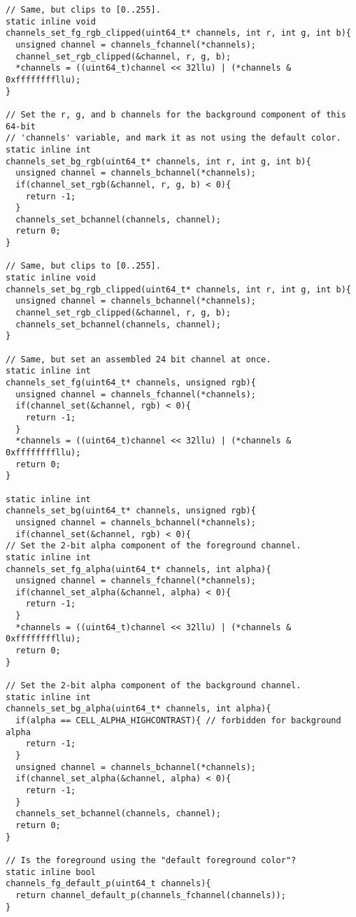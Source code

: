 \begin{verbatim}
// Same, but clips to [0..255].
static inline void
channels_set_fg_rgb_clipped(uint64_t* channels, int r, int g, int b){
  unsigned channel = channels_fchannel(*channels);
  channel_set_rgb_clipped(&channel, r, g, b);
  *channels = ((uint64_t)channel << 32llu) | (*channels & 0xffffffffllu);
}

// Set the r, g, and b channels for the background component of this 64-bit
// 'channels' variable, and mark it as not using the default color.
static inline int
channels_set_bg_rgb(uint64_t* channels, int r, int g, int b){
  unsigned channel = channels_bchannel(*channels);
  if(channel_set_rgb(&channel, r, g, b) < 0){
    return -1;
  }
  channels_set_bchannel(channels, channel);
  return 0;
}

// Same, but clips to [0..255].
static inline void
channels_set_bg_rgb_clipped(uint64_t* channels, int r, int g, int b){
  unsigned channel = channels_bchannel(*channels);
  channel_set_rgb_clipped(&channel, r, g, b);
  channels_set_bchannel(channels, channel);
}

// Same, but set an assembled 24 bit channel at once.
static inline int
channels_set_fg(uint64_t* channels, unsigned rgb){
  unsigned channel = channels_fchannel(*channels);
  if(channel_set(&channel, rgb) < 0){
    return -1;
  }
  *channels = ((uint64_t)channel << 32llu) | (*channels & 0xffffffffllu);
  return 0;
}

static inline int
channels_set_bg(uint64_t* channels, unsigned rgb){
  unsigned channel = channels_bchannel(*channels);
  if(channel_set(&channel, rgb) < 0){
// Set the 2-bit alpha component of the foreground channel.
static inline int
channels_set_fg_alpha(uint64_t* channels, int alpha){
  unsigned channel = channels_fchannel(*channels);
  if(channel_set_alpha(&channel, alpha) < 0){
    return -1;
  }
  *channels = ((uint64_t)channel << 32llu) | (*channels & 0xffffffffllu);
  return 0;
}

// Set the 2-bit alpha component of the background channel.
static inline int
channels_set_bg_alpha(uint64_t* channels, int alpha){
  if(alpha == CELL_ALPHA_HIGHCONTRAST){ // forbidden for background alpha
    return -1;
  }
  unsigned channel = channels_bchannel(*channels);
  if(channel_set_alpha(&channel, alpha) < 0){
    return -1;
  }
  channels_set_bchannel(channels, channel);
  return 0;
}

// Is the foreground using the "default foreground color"?
static inline bool
channels_fg_default_p(uint64_t channels){
  return channel_default_p(channels_fchannel(channels));
}


\end{verbatim}
